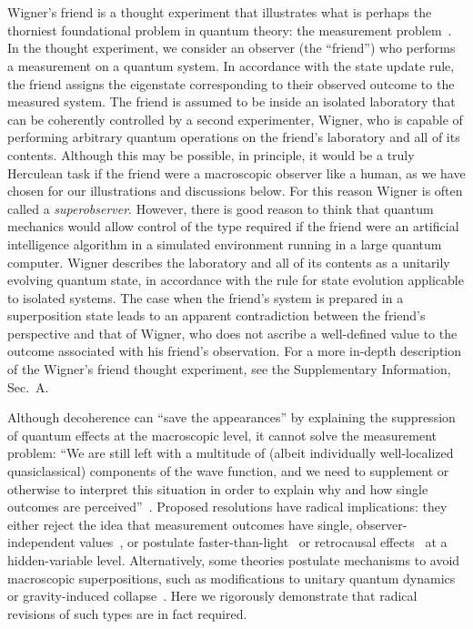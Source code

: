\documentclass[aps,prx,twocolumn,superscriptaddress]{revtex4-1}
\theoremstyle{plain}
\begin{document}
\section{}
Wigner's friend \cite{Wigner} is a thought experiment that illustrates what is perhaps the thorniest foundational problem in quantum theory: the measurement problem~\cite{Schlosshauer2004, Leggett2005}. In the thought experiment, we consider an observer (the ``friend'') who performs a measurement on a quantum system.
In accordance with the state update rule, the friend assigns the eigenstate corresponding to their observed outcome to the measured system. The friend is assumed to be inside an isolated laboratory that can be coherently controlled by a second experimenter, Wigner, who is capable of performing arbitrary quantum operations on the friend's laboratory and all of its contents. Although this may be possible, in principle, it would be a truly Herculean task if the friend were a macroscopic observer like a human, as we have chosen for our illustrations and discussions below. For this reason Wigner is often called a \emph{superobserver}. However, there is good reason to think that quantum mechanics would allow control of the type required if the friend were an artificial intelligence algorithm in a simulated environment running in a large quantum computer. Wigner describes the laboratory and all of its contents as a unitarily evolving quantum state, in accordance with the rule for state evolution applicable to isolated systems. The case when the friend’s system is prepared in a superposition state leads to an apparent contradiction between the friend’s perspective and that of Wigner, who does not ascribe a well-defined value to the outcome associated with his friend’s observation. For a more in-depth description of the Wigner's friend thought experiment, see the Supplementary Information, Sec.\ A.

Although decoherence can ``save the appearances'' by explaining the suppression of quantum effects at the macroscopic level, it cannot solve the measurement problem: ``We are still left with a multitude of (albeit individually well-localized quasiclassical) components of the wave function, and we need to supplement or otherwise to interpret this situation in order to explain why and how single outcomes are perceived''~\cite{Schlosshauer2004}. Proposed resolutions have radical implications: they either reject the idea that measurement outcomes have single, observer-independent values~\cite{Everett1957, Rovelli1996, Fuchs2013, Mermin2014}, or postulate faster-than-light~\cite{Bohm1, Bohm2} or retrocausal effects~\cite{Price2008, tHooft2007} at a hidden-variable level. Alternatively, some theories postulate mechanisms to avoid macroscopic superpositions, such as modifications to unitary quantum dynamics~\cite{Bassi2003} or gravity-induced collapse~\cite{Penrose1996}. Here we rigorously demonstrate that radical revisions of such types are in fact required.
\end{document}

